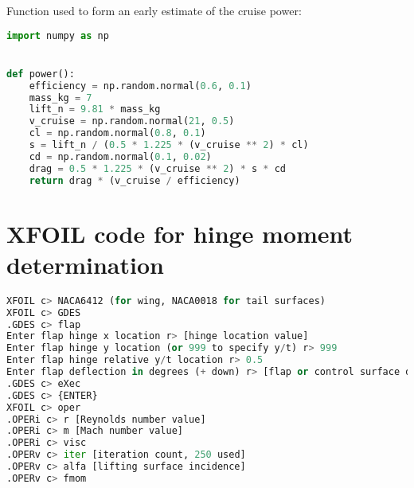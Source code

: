 \documentclass[../main.tex]{subfiles}
\begin{document}
Function used to form an early estimate of the cruise power:

\begin{lstlisting}[language=python,firstnumber=1]
import numpy as np


def power():
    efficiency = np.random.normal(0.6, 0.1)
    mass_kg = 7
    lift_n = 9.81 * mass_kg
    v_cruise = np.random.normal(21, 0.5)
    cl = np.random.normal(0.8, 0.1)
    s = lift_n / (0.5 * 1.225 * (v_cruise ** 2) * cl)
    cd = np.random.normal(0.1, 0.02)
    drag = 0.5 * 1.225 * (v_cruise ** 2) * s * cd
    return drag * (v_cruise / efficiency)
\end{lstlisting}

\section{XFOIL code for hinge moment determination} \label{appendix:xfoil-code}

\begin{lstlisting}[language=python,firstnumber=1]
XFOIL c> NACA6412 (for wing, NACA0018 for tail surfaces) 
XFOIL c> GDES 
.GDES c> flap 
Enter flap hinge x location r> [hinge location value] 
Enter flap hinge y location (or 999 to specify y/t) r> 999 
Enter flap hinge relative y/t location r> 0.5 
Enter flap deflection in degrees (+ down) r> [flap or control surface deflection value] 
.GDES c> eXec 
.GDES c> {ENTER} 
XFOIL c> oper 
.OPERi c> r [Reynolds number value] 
.OPERi c> m [Mach number value] 
.OPERi c> visc 
.OPERv c> iter [iteration count, 250 used] 
.OPERv c> alfa [lifting surface incidence] 
.OPERv c> fmom 
\end{lstlisting}
\end{document}
